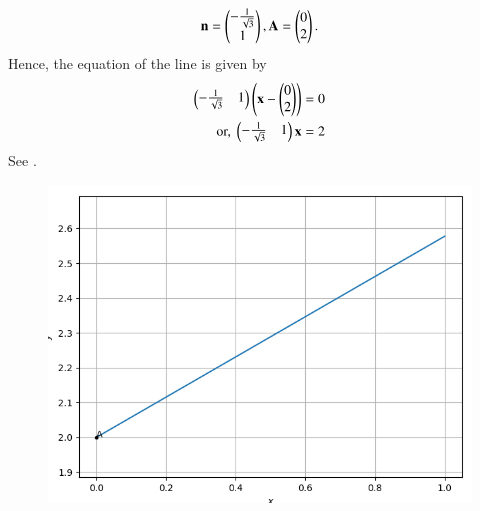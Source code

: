 \begin{align}
    \mathbf{n} =  \begin{pmatrix}-\frac{1}{\sqrt{3}} \\ 1\end{pmatrix},
    \mathbf{A} = \begin{pmatrix}0 \\ 2\end{pmatrix}.
\end{align}
Hence, 
the equation of the line is given by
\begin{align}
\begin{pmatrix}-\frac{1}{\sqrt{3}}&1\end{pmatrix}\left( \mathbf{x} - \begin{pmatrix}0 \\ 2\end{pmatrix}\right) &= 0  \\
    \text{or, }	\begin{pmatrix}-\frac{1}{\sqrt{3}}&1\end{pmatrix} \mathbf{x}  &= 2
\end{align}
%
See
    .
\begin{figure}[!htb]
    \centering
    \includegraphics[width=\columnwidth]{chapters/11/10/2/6/figs/line.png}
    \caption{}
    \label{fig:chapters/11/10/2/6/line}
\end{figure}

